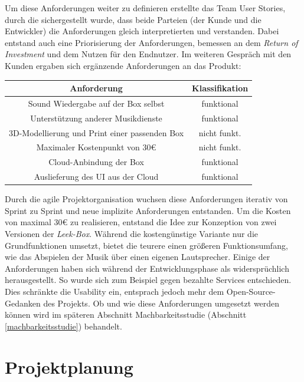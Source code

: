 \documentclass[10pt, a4paper]{article}
\begin{document}
Um diese Anforderungen weiter zu definieren erstellte das Team User Stories,
durch die sichergestellt wurde, dass beide Parteien (der Kunde und die Entwickler) die Anforderungen  gleich interpretierten und verstanden.
Dabei entstand auch eine Priorisierung der Anforderungen, bemessen an dem \textit{Return of Investment} und dem Nutzen für den Endnutzer.
Im weiteren Gespräch mit den Kunden ergaben sich ergänzende Anforderungen an das Produkt:
\begin{center}
  \begin{tabular}[h]{c|c}
    Anforderung & Klassifikation \\
    \hline
    Sound Wiedergabe auf der Box selbst & funktional  \\
    Unterstützung anderer Musikdienste & funktional \\
    3D-Modellierung und Print einer passenden Box & nicht funkt.  \\
    Maximaler Kostenpunkt von 30€ & nicht funkt.  \\
    Cloud-Anbindung der Box & funktional \\
    Auslieferung des UI aus der Cloud & funktional \\
    \end{tabular}
\end{center}

Durch die agile Projektorganisation wuchsen diese Anforderungen iterativ von Sprint zu Sprint und neue implizite Anforderungen entstanden.
Um die Kosten von maximal 30€ zu realisieren, entstand die Idee zur Konzeption von zwei Versionen der \textit{Leek-Box}. Während die kostengünstige Variante nur die Grundfunktionen umsetzt, bietet die teurere einen größeren Funktionsumfang, wie das Abspielen der Musik über einen eigenen Lautsprecher.
Einige der Anforderungen haben sich während der Entwicklungsphase als widersprüchlich herausgestellt.
So wurde sich zum Beispiel gegen bezahlte Services entschieden. Dies schränkte die Usability ein, entsprach jedoch mehr dem Open-Source-Gedanken des Projekts.
Ob und wie diese Anforderungen umgesetzt werden können wird im späteren Abschnitt Machbarkeitsstudie (Abschnitt \ref{machbarkeitsstudie}) behandelt.

\section{Projektplanung}
\end{document}

